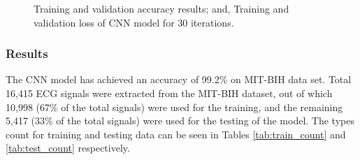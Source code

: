 \begin{figure}%
	\centering
	
	\hspace{8pt}%
	\caption[A set of four subfigures.]{
		 Training and validation accuracy results; and,
		 Training and validation loss of CNN model for 30 iterations.}%
	\label{fig:acc_val}%
\end{figure}


\subsubsection{Results}
The CNN model has achieved an accuracy of 99.2\% on MIT-BIH data set. Total 16,415 ECG signals were extracted from the MIT-BIH dataset, out of which 10,998 (67\% of the total signals) were used for the training, and the remaining 5,417 (33\% of the total signals) were used for the testing of the model. The types count for training and testing data can be seen in Tables \ref{tab:train_count} and \ref{tab:test_count} respectively. 

